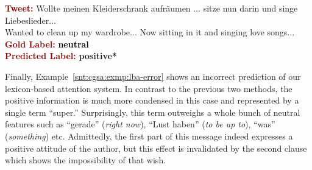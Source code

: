 \begin{example}\label{snt:cgsa:exmp:baziotis-error}
  \noindent\textup{\bfseries\textcolor{darkred}{Tweet:}} {\upshape \colorbox{white!1.4}{Wollte} \colorbox{blue!7.7}{meinen} \colorbox{white!3.6}{Kleiderschrank} \colorbox{blue!1.7}{aufr\"aumen} ... \colorbox{white!1.2}{sitze} \colorbox{green!4.6}{nun} \colorbox{green!31.5}{darin} \colorbox{green!2.8}{und} \colorbox{green!29.7}{singe} \colorbox{green!15.2}{Liebeslieder}...}\\
  \noindent \colorbox{white!1.4}{Wanted} to \colorbox{blue!1.7}{clean up} \colorbox{blue!7.7}{my} \colorbox{white!3.6}{wardrobe}... \colorbox{green!4.6}{Now} \colorbox{white!1.2}{sitting} \colorbox{green!31.5}{in it} \colorbox{green!2.8}{and} \colorbox{green!29.7}{singing} \colorbox{green!15.2}{love songs}...\\[\exampleSep]
  \noindent\textup{\bfseries\textcolor{darkred}{Gold Label:}}\hspace*{4.3em}\textbf{%
    \upshape\textcolor{black}{neutral}}\\
 \noindent\textup{\bfseries\textcolor{darkred}{Predicted Label:}}\hspace*{2em}\textbf{%
    \upshape\textcolor{green3}{positive*}}
\end{example}

Finally, Example~\ref{snt:cgsa:exmp:lba-error} shows an incorrect
prediction of our lexicon-based attention system.  In contrast to the
previous two methods, the positive information is much more condensed
in this case and represented by a single term ``super.''
Surprisingly, this term outweighs a whole bunch of neutral features
such as ``gerade'' (\emph{right now}), ``Lust haben'' (\emph{to be up
  to}), ``was'' (\emph{something}) etc.  Admittedly, the first part of
this message indeed expresses a positive attitude of the author, but
this effect is invalidated by the second clause which shows the
impossibility of that wish.

